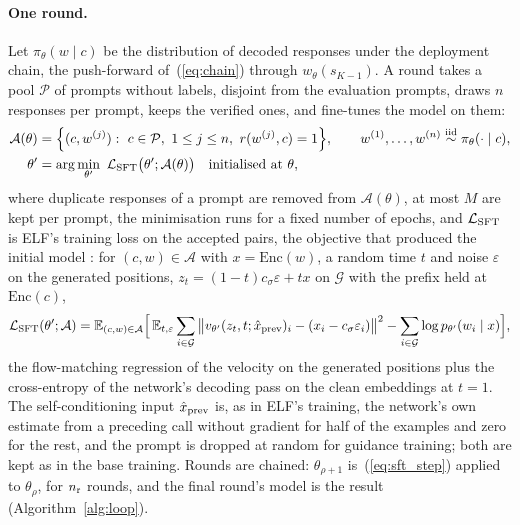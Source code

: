 \paragraph{One round.}
Let $\pi_\theta(w\mid c)$ be the distribution of decoded responses under the deployment chain, the push-forward of~(\ref{eq:chain}) through $w_\theta(s_{K-1})$. A round takes a pool $\mathcal P$ of prompts without labels, disjoint from the evaluation prompts, draws $n$ responses per prompt, keeps the verified ones, and fine-tunes the model on them:
\begin{align}
\mathcal A(\theta)&=\Big\{(c,w^{(j)}):\ c\in\mathcal P,\ 1\le j\le n,\ r(w^{(j)},c)=1\Big\},\qquad w^{(1)},\dots,w^{(n)}\overset{\text{iid}}{\sim}\pi_\theta(\cdot\mid c),
\label{eq:accept}\\
\theta'&=\arg\min_{\theta'}\ \mathcal L_{\rm SFT}\big(\theta';\mathcal A(\theta)\big)\quad\text{initialised at }\theta,
\label{eq:sft_step}
\end{align}
where duplicate responses of a prompt are removed from $\mathcal A(\theta)$, at most $M$ are kept per prompt, the minimisation runs for a fixed number of epochs, and $\mathcal L_{\rm SFT}$ is ELF's training loss on the accepted pairs, the objective that produced the initial model \citep{hu2026elf}: for $(c,w)\in\mathcal A$ with $x=\mathrm{Enc}(w)$, a random time $t$ and noise $\varepsilon$ on the generated positions, $z_t=(1-t)c_\sigma\varepsilon+tx$ on $\mathcal G$ with the prefix held at $\mathrm{Enc}(c)$,
\begin{equation}
\mathcal L_{\rm SFT}(\theta';\mathcal A)=\mathbb E_{(c,w)\in\mathcal A}\Big[\,\mathbb E_{t,\varepsilon}\sum_{i\in\mathcal G}\big\|v_{\theta'}(z_t,t;\hat x_{\rm prev})_i-(x_i-c_\sigma\varepsilon_i)\big\|^2-\sum_{i\in\mathcal G}\log p_{\theta'}(w_i\mid x)\Big],
\label{eq:sft}
\end{equation}
the flow-matching regression of the velocity on the generated positions plus the cross-entropy of the network's decoding pass on the clean embeddings at $t=1$. The self-conditioning input $\hat x_{\rm prev}$ is, as in ELF's training, the network's own estimate from a preceding call without gradient for half of the examples and zero for the rest, and the prompt is dropped at random for guidance training; both are kept as in the base training. Rounds are chained: $\theta_{\rho+1}$ is~(\ref{eq:sft_step}) applied to $\theta_\rho$, for $n_{\rm r}$ rounds, and the final round's model is the result (Algorithm~\ref{alg:loop}).

